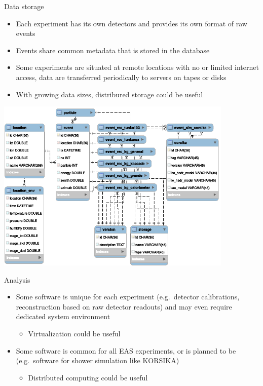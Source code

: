\documentclass[18pt]{beamer}
\begin{document}
\begin{frame}[allowframebreaks]{Data storage}
\begin{itemize}
  \item Each experiment has its own detectors and provides its own format of raw events
  \item Events share common metadata that is stored in the database
  \item Some experiments are situated at remote locations with no or limited internet access, data are transferred periodically to servers on tapes or disks
  \item With growing data sizes, distribured storage could be useful
\end{itemize}
\begin{center}
\includegraphics[width=0.85\textwidth]{pics/metadata.eps}
\end{center}
\end{frame}

\begin{frame}{Analysis}
\begin{itemize}
  \item Some software is unique for each experiment (e.g.\ detector calibrations, reconstruction based on raw detector readouts) and may even require dedicated system environment
  \begin{itemize}
    \item Virtualization could be useful
  \end{itemize}
  \item Some software is common for all EAS experiments, or is planned to be (e.g.\ software for shower simulation like KORSIKA)
  \begin{itemize}
    \item Distributed computing could be useful
  \end{itemize}
\end{itemize}
\end{frame}
\end{document}
